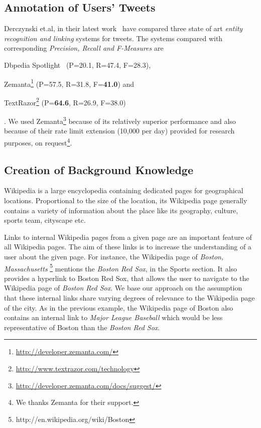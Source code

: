 \subsection{Annotation of Users' Tweets}
Derczynski et.al, in their latest work~\cite{derczynski2013} have compared three state of art \textit{entity recognition and linking} systems for tweets. The systems compared with corresponding \textit{Precision, Recall and F-Measures} are \begin{inparaenum} \item Dbpedia Spotlight~\cite{mendes2011dbpedia} (P=20.1, R=47.4, F=28.3), \item Zemanta\footnote{\url{http://developer.zemanta.com/}} (P=57.5, R=31.8, F=\textbf{41.0}) and \item TextRazor\footnote{\url{http://www.textrazor.com/technology}} (P=\textbf{64.6}, R=26.9, F=38.0) \end{inparaenum}. We used Zemanta\footnote{\url{http://developer.zemanta.com/docs/suggest/}} because of its relatively superior performance and also because of their rate limit extension (10,000 per day) provided for research purposes, on request\footnote{We thanks Zemanta for their support.}. 

\subsection{Creation of Background Knowledge}
Wikipedia is a large encyclopedia containing dedicated pages for geographical locations. Proportional to the size of the location, its Wikipedia page generally contains a variety of information about the place like its geography, culture, sports team, cityscape etc.

Links to internal Wikipedia pages from a given page are an important feature of all Wikipedia pages. The aim of these links is to increase the understanding of a user about the given page. For instance, the Wikipedia page of \textit{Boston, Massachusetts} \footnote{http://en.wikipedia.org/wiki/Boston} mentions the \textit{Boston Red Sox}, in the Sports section. It also provides a hyperlink to Boston Red Sox, that allows the user to navigate to the Wikipedia page of \textit{Boston Red Sox}. We base our approach on the assumption that these internal links share varying degrees of relevance to the Wikipedia page of the city. As in the previous example, the Wikipedia page of Boston also contains an internal link to \textit{Major League Baseball} which would be less representative of Boston than the \textit{Boston Red Sox}. 

